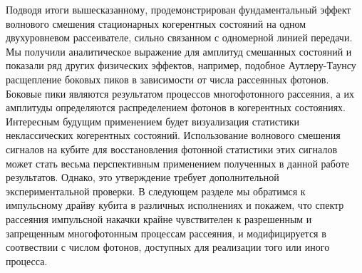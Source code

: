 Подводя итоги вышесказанному, продемонстрирован фундаментальный эффект волнового смешения стационарных когерентных состояний на одном двухуровневом рассеивателе, сильно связанном с одномерной линией передачи. Мы получили аналитическое выражение для амплитуд смешанных состояний и показали ряд других физических эффектов, например, подобное Аутлеру-Таунсу расщепление боковых пиков в зависимости от числа рассеянных фотонов. Боковые пики являются результатом процессов многофотонного рассеяния, а их амплитуды определяются распределением фотонов в когерентных состояниях. Интересным будущим применением будет визуализация статистики неклассических когерентных состояний. Использование волнового смешения сигналов на кубите для восстановления фотонной статистики этих сигналов может стать весьма перспективным применением полученных в данной работе результатов. Однако, это утверждение требует дополнительной экспериментальной проверки. В следующем разделе мы обратимся к импульсному драйву кубита в различных исполнениях и покажем, что спектр рассеяния импульсной накачки крайне чувствителен к разрешенным и запрещенным многофотонным процессам рассеяния, и модифицируется в соотвествии с числом фотонов, доступных для реализации того или иного процесса. 


 




